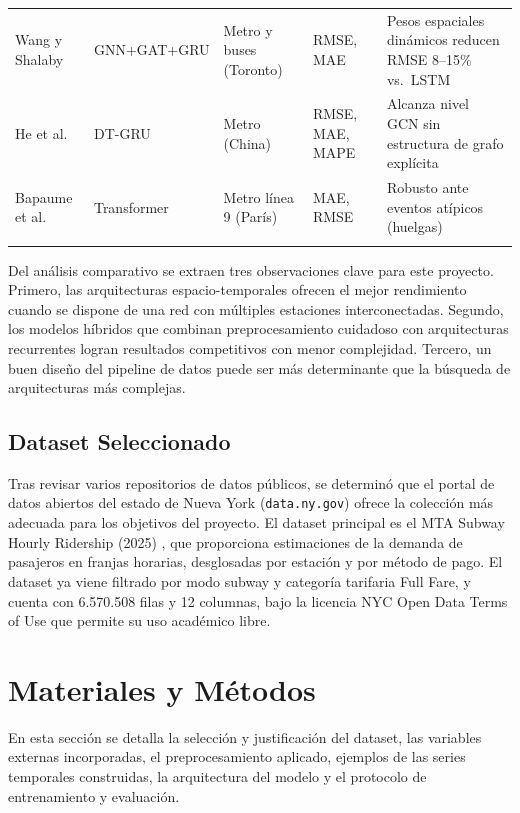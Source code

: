 \documentclass[preprint,12pt]{elsarticle}
\begin{document}
\begin{table}[htbp]
\begin{tabular}{p{2.2cm} p{2cm} p{2.2cm} p{1.5cm} p{3.8cm}}
\addlinespace
Wang y Shalaby \cite{wang2024} & GNN+GAT+GRU & Metro y buses (Toronto) & RMSE, MAE & Pesos espaciales dinámicos reducen RMSE 8--15\% vs.\ LSTM \\
\addlinespace
He et al.\ \cite{he2024} & DT-GRU & Metro (China) & RMSE, MAE, MAPE & Alcanza nivel GCN sin estructura de grafo explícita \\
\addlinespace
Bapaume et al.\ \cite{bapaume2023} & Transformer & Metro línea 9 (París) & MAE, RMSE & Robusto ante eventos atípicos (huelgas) \\
\addlinespace
\bottomrule
\end{tabular}
\end{table}

Del análisis comparativo se extraen tres observaciones clave para este proyecto. Primero, las arquitecturas espacio-temporales ofrecen el mejor rendimiento cuando se dispone de una red con múltiples estaciones interconectadas. Segundo, los modelos híbridos que combinan preprocesamiento cuidadoso con arquitecturas recurrentes logran resultados competitivos con menor complejidad. Tercero, un buen diseño del pipeline de datos puede ser más determinante que la búsqueda de arquitecturas más complejas. 

\subsection{Dataset Seleccionado}

Tras revisar varios repositorios de datos públicos, se determinó que el portal de datos abiertos del estado de Nueva York (\texttt{data.ny.gov}) ofrece la colección más adecuada para los objetivos del proyecto. El dataset principal es el MTA Subway Hourly Ridership (2025) \cite{mta_hourly}, que proporciona estimaciones de la demanda de pasajeros en franjas horarias, desglosadas por estación y por método de pago. El dataset ya viene filtrado por modo subway y categoría tarifaria Full Fare, y cuenta con 6.570.508 filas y 12 columnas, bajo la licencia NYC Open Data Terms of Use que permite su uso académico libre.



\section{Materiales y Métodos}

En esta sección se detalla la selección y justificación del dataset, las variables externas incorporadas, el preprocesamiento aplicado, ejemplos de las series temporales construidas, la arquitectura del modelo y el protocolo de entrenamiento y evaluación.
\end{document}
